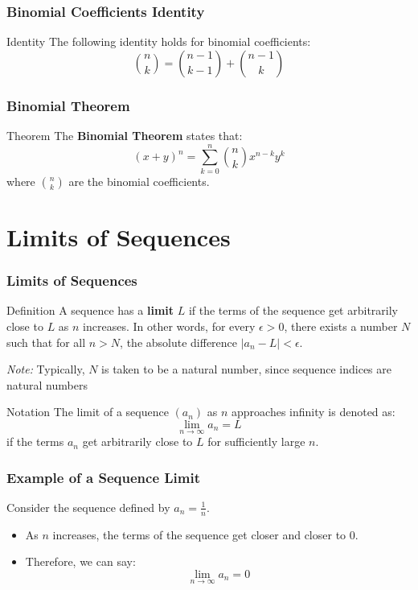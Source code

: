 \begin{frame}
\frametitle{Binomial Coefficients Identity}
\begin{block}{Identity}
The following identity holds for binomial coefficients:
\[
\binom{n}{k} = \binom{n-1}{k-1} + \binom{n-1}{k}
\]
\end{block}
\end{frame}

\begin{frame}
    \frametitle{Binomial Theorem}
    \begin{block}{Theorem}
    The \textbf{Binomial Theorem} states that:
    \[
    (x + y)^n = \sum_{k=0}^{n} \binom{n}{k} x^{n-k} y^k
    \]
    where \(\binom{n}{k}\) are the binomial coefficients.
    \end{block}
\end{frame}

\section{Limits of Sequences}
\begin{frame}
    \frametitle{Limits of Sequences}
    \begin{block}{Definition}
        A sequence has a \textbf{limit} \(L\) if the terms of the sequence get arbitrarily close to \(L\) as \(n\) increases. In other words, for every \(\epsilon > 0\), there exists a number \(N\) such that for all \(n > N\), the absolute difference \(|a_n - L| < \epsilon\).

        \textit{Note:} Typically, \(N\) is taken to be a natural number, since sequence indices are natural numbers
    \end{block} 
    \begin{block}{Notation}
        The limit of a sequence \((a_n)\) as \(n\) approaches infinity is denoted as:
        \[
        \lim_{n \to \infty} a_n = L
        \]
        if the terms \(a_n\) get arbitrarily close to \(L\) for sufficiently large \(n\).
    \end{block}
\end{frame}

\begin{frame}
    \frametitle{Example of a Sequence Limit}
    Consider the sequence defined by \(a_n = \frac{1}{n}\).
    \begin{itemize}
        \item As \(n\) increases, the terms of the sequence get closer and closer to 0.
        \item Therefore, we can say:
        \[
        \lim_{n \to \infty} a_n = 0
        \]
    \end{itemize}
\end{frame}

